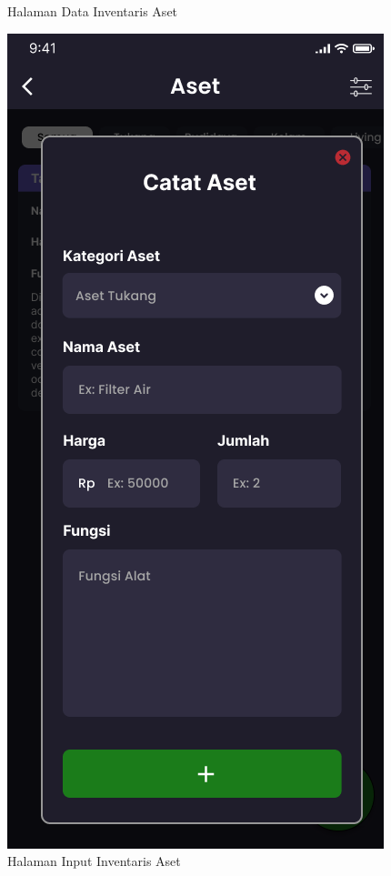 \begin{enumerate}
\begin{enumerate}
\begin{figure}[H]
			  \caption{Halaman Data Inventaris Aset}
			\endminipage\hfill
			  \includegraphics[width=\linewidth]{gambar/sprint1/mockup_input_aset.png}
			  \caption{Halaman Input Inventaris Aset}
			\endminipage
			\hspace{.05\linewidth}
		\end{figure}


\end{enumerate}
\end{enumerate}
